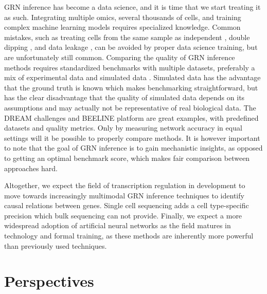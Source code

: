GRN inference has become a data science, and it is time that we start treating it as such. Integrating multiple omics, several thousands of cells, and training complex machine learning models requires specialized knowledge. Common mistakes, such as treating cells from the same sample as independent \cite{Zimmerman_2021}, double dipping \cite{https://doi.org/10.48550/arxiv.2012.02936}, and data leakage \cite{Schreiber_2020}, can be avoided by proper data science training, but are unfortunately still common. Comparing the quality of GRN inference methods requires standardized benchmarks with multiple datasets, preferably a mix of experimental data and simulated data \cite{Dibaeinia_2020,Li_2022,Ventre_2022}. Simulated data has the advantage that the ground truth is known which makes benchmarking straightforward, but has the clear disadvantage that the quality of simulated data depends on its assumptions and may actually not be representative of real biological data. The DREAM challenges \cite{Cokelaer_2016,dream} and BEELINE platform \cite{Pratapa_2020} are great examples, with predefined datasets and quality metrics. Only by measuring network accuracy in equal settings will it be possible to properly compare methods. It is however important to note that the goal of GRN inference is to gain mechanistic insights, as opposed to getting an optimal benchmark score, which makes fair comparison between approaches hard.

Altogether, we expect the field of transcription regulation in development to move towards increasingly multimodal GRN inference techniques to identify causal relations between genes. Single cell sequencing adds a cell type-specific precision which bulk sequencing can not provide. Finally, we expect a more widespread adoption of artificial neural networks as the field matures in technology and formal training, as these methods are inherently more powerful than previously used techniques.

\section{Perspectives}

